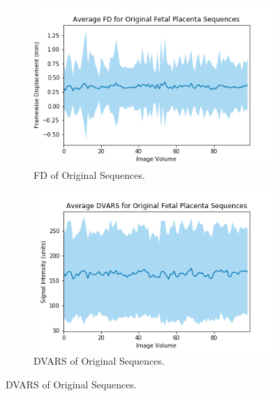 \begin{figure}
	\centering
	\begin{subfigure}{0.4\textwidth}
		\centering
		\includegraphics[width=1.0\textwidth]{6/figures/fetal-placenta-bold-fd-150.png}
		\caption{FD of Original Sequences.}
	\end{subfigure}
	\hspace{0.05\textwidth}
	\begin{subfigure}{0.4\textwidth}
		\centering
		\includegraphics[width=1.0\textwidth]{6/figures/fetal-placenta-bold-dvars-150.png}
		\caption{DVARS of Original Sequences.}
	\end{subfigure}
	

\end{figure}
